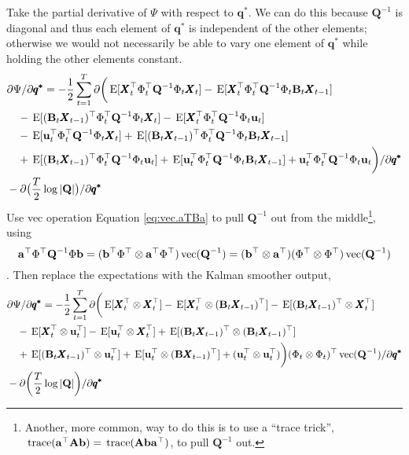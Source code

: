 \documentclass[]{article}
\def\AA{\mbox{$\mathbf A$}}	\def\aa{\mbox{$\mathbf a$}}
\def\BB{\mbox{$\mathbf B$}}	\def\bb{\mbox{$\mathbf b$}}
\def\QQ{\mbox{$\mathbf Q$}}	 \def\qq{\mbox{$\mathbf q$}}
\def\XX{\mbox{$\pmb{X}$}}	\def\xx{\mbox{$\pmb{x}$}}
\def\E{\,\textup{\textrm{E}}}
\def\vec{\,\textup{\textrm{vec}}}
\def\trace{\,\textup{\textrm{trace}}}
\begin{document}
Take the partial derivative of $\Psi$ with respect to $\pmb{q^{*}}$.  We can do this because $\QQ^{-1}$ is diagonal and thus each element of $\pmb{q^{*}}$ is independent of the other elements; otherwise we would not necessarily be able to vary one element of $\pmb{q^{*}}$ while holding the other elements constant.
\begin{equation}
\begin{split}
&\partial\Psi/\partial\pmb{q^{*}} = -\frac{1}{2} \sum_{t=1}^T\partial\bigg(
\E[\XX_t^\top\Phi_t^\top\QQ^{-1}\Phi_t\XX_t]
-\E[\XX_t^\top\Phi_t^\top\QQ^{-1}\Phi_t\BB_t\XX_{t-1}] \\
&\quad -\E[(\BB_t\XX_{t-1})^\top\Phi_t^\top\QQ^{-1}\Phi_t\XX_t] 
 - \E[\XX_t^\top\Phi_t^\top\QQ^{-1}\Phi_t\uu_t] \\
&\quad - \E[\uu_t^\top\Phi_t^\top\QQ^{-1}\Phi_t\XX_t] 
+ \E[(\BB_t\XX_{t-1})^\top\Phi_t^\top\QQ^{-1}\Phi_t\BB_t\XX_{t-1}] \\
&\quad + \E[(\BB_t\XX_{t-1})^\top\Phi_t^\top\QQ^{-1}\Phi_t\uu_t] 
+ \E[\uu_t^\top\Phi_t^\top\QQ^{-1}\Phi_t\BB_t\XX_{t-1}] + \uu_t^\top\Phi_t^\top\QQ^{-1}\Phi_t\uu_t \bigg)/\partial\pmb{q^{*}}\\
& - \partial\big(\frac{T}{2}\log |\QQ| \big)/\partial\pmb{q^{*}} \\
\end{split}
\end{equation}
Use vec operation Equation \ref{eq:vec.aTBa} to pull $\QQ^{-1}$ out from the middle\footnote{Another, more common, way to do this is to use a ``trace trick'', $\trace(\aa^\top\AA\bb)=\trace(\AA\bb\aa^\top)$, to pull $\QQ^{-1}$ out.}, using 
$$\aa^\top \Phi^\top \QQ^{-1} \Phi \bb = (\bb^\top\Phi^\top \otimes \aa^\top \Phi^\top)\vec(\QQ^{-1}) = (\bb^\top \otimes \aa^\top)(\Phi^\top \otimes \Phi^\top)\vec(\QQ^{-1})$$.
Then replace the expectations with the Kalman smoother output,
\begin{equation}\label{eq:Q.gendiag2}
\begin{split}
&\partial\Psi/\partial\pmb{q^{*}} = -\frac{1}{2} \sum_{t=1}^T\partial\bigg(
\E[\XX_t^\top \otimes \XX_t^\top ]
-\E[\XX_t^\top \otimes (\BB_t\XX_{t-1})^\top] -\E[(\BB_t\XX_{t-1})^\top \otimes \XX_t^\top] \\
&\quad  - \E[\XX_t^\top \otimes \uu_t^\top] - \E[\uu_t^\top \otimes \XX_t^\top]
+ \E[(\BB_t\XX_{t-1})^\top \otimes (\BB_t\XX_{t-1})^\top] \\
&\quad + \E[(\BB_t\XX_{t-1})^\top \otimes \uu_t^\top]
+ \E[\uu_t^\top \otimes (\BB\XX_{t-1})^\top] + (\uu_t^\top \otimes \uu_t^\top) \bigg)(\Phi_t \otimes \Phi_t)^\top\vec(\QQ^{-1})/\partial\pmb{q^{*}}\\
& - \partial\bigg(\frac{T}{2}\log |\QQ| \bigg)/\partial\pmb{q^{*}} \\
\end{split}
\end{equation}
\end{document}
